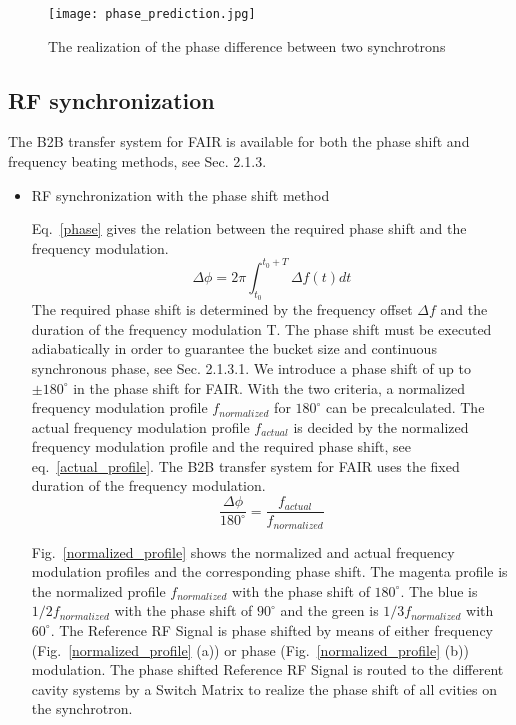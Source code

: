 \begin{figure}[!htb]
   \centering   
   \texttt{[image: phase\_prediction.jpg]}
   \caption{The realization of the phase difference between two synchrotrons}
   \label{phase_prediction}
\end{figure}

 
\subsection{RF synchronization}
The B2B transfer system for FAIR is available for both the phase shift and frequency beating methods, see Sec. 2.1.3.
\begin{itemize}
\item RF synchronization with the phase shift method

Eq.~\ref{phase} gives the relation between the required phase shift and the frequency modulation. 
\begin{equation}
\Delta \phi= 2\pi \int_{t_0}^{t_0+T} \Delta f(t)dt \label{phase}
\end{equation}
The required phase shift is determined by the frequency offset $\Delta f$ and the duration of the frequency modulation T. The phase shift must be executed adiabatically in order to guarantee the bucket size and continuous synchronous phase, see Sec. 2.1.3.1. We introduce a phase shift of up to $\pm 180^\circ$ in the phase shift for FAIR. With the two criteria, a normalized frequency modulation profile $f_{normalized}$ for $180^\circ$ can be precalculated. The actual frequency modulation profile $f_{actual}$ is decided by the normalized frequency modulation profile and the required phase shift, see eq.~\ref{actual_profile}. The B2B transfer system for FAIR uses the fixed duration of the frequency modulation. 
\begin{equation}
\frac{\Delta\phi}{180^\circ}= \frac{f_{actual}}{f_{normalized}} \label{actual_profile}
\end{equation}

Fig.~\ref{normalized_profile} shows the normalized and actual frequency modulation profiles and the corresponding phase shift. The magenta profile is the normalized profile $f_{normalized}$ with the phase shift of $180^\circ$. The blue is $1/2f_{normalized}$ with the phase shift of $90^\circ$ and the green is $1/3f_{normalized}$ with $60^\circ$. The Reference RF Signal is phase shifted by means of either frequency (Fig.~\ref{normalized_profile} (a)) or phase (Fig.~\ref{normalized_profile} (b)) modulation. The phase shifted Reference RF Signal is routed to the different cavity systems by a Switch Matrix to realize the phase shift of all cvities on the synchrotron.
                       

\end{itemize}
